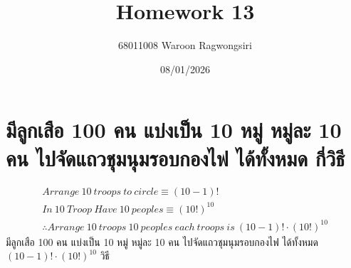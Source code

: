 \documentclass{article}
\title{Homework 13}
\author{68011008 Waroon Ragwongsiri}
\date{08/01/2026}
\begin{document}
\maketitle

{\small
\section{มีลูกเสือ 100 คน แบ่งเป็น 10 หมู่ หมู่ละ 10 คน ไปจัดแถวชุมนุมรอบกองไฟ ได้ทั้งหมด กี่วิธี}
}
\begin{align}
	Arrange\ 10\ troops\ to\ circle \equiv (10 - 1)! \\
	In\ 10\ Troop\ Have\ 10\ peoples \equiv (10!)^{10} \\
	\therefore Arrange\ 10\ troops\ 10\ peoples\ each\ troops\ is\ (10 - 1)! \cdot (10!)^{10}
\end{align}
\therefore มีลูกเสือ 100 คน แบ่งเป็น 10 หมู่ หมู่ละ 10 คน ไปจัดแถวชุมนุมรอบกองไฟ ได้ทั้งหมด $(10 - 1)! \cdot (10!)^{10}$ วิธี
\end{document}
